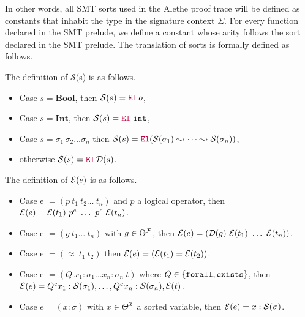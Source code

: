 \smallskip

In other words, all SMT sorts used in the Alethe proof trace will be defined as constants that inhabit the type \set{} in the signature context $\Sigma$.
For every function declared in the SMT prelude, we define a constant whose arity follows the sort declared in the SMT prelude. The translation of sorts is formally defined as follows.

\smallskip

\begin{definition} 
  The definition of $\mathcal{S}$(s) is as follows.
  \begin{itemize}
    \item Case $s = \textbf{Bool}$, then $\Sort{s} = \el\,o$,
    \item Case $s = \textbf{Int}$, then $\Sort{s} = \el~\texttt{int}$,
    \item Case $s = \sigma_1\,\sigma_2 \dots \sigma_n$ then $\Sort{s} = \el{} (\mathcal{S}(\sigma_1) \leadsto \dots \leadsto \mathcal{S}(\sigma_n))$,
    \item otherwise $\Sort{s} = \el\, \mathcal{D}(s)$.
  \end{itemize}
\end{definition}


\begin{definition}
The definition of $\E{e}$ is as follows.
\begin{itemize}
\setlength{\parskip}{0pt}
\item Case e $= (p~t_1~t_2\dots~t_n)$ and $p$ a logical operator, then $\E{e} = \E{t_1}~p^c~\dots~p^c~\E{t_n}$.
\item Case e $= (g~t_1\dots~t_n)$ with $g \in \Theta^\cal{F}$, then $\E{e} = (\mathcal{D}(g)~\E{t_1}~\dots~\E{t_n})$.
\item Case e $= (\approx~t_1~t_2)$ then $\E{e} = (\E{t_1} = \E{t_2})$.
\item Case e $= (Q~x_1 : \sigma_1  \dots x_n : \sigma_n ~t)$ where $Q\in \{\kw{forall}, \kw{exists}\}$, then $\E{e} = Q^c x_1: \cal{S}(\sigma_1), \dots, Q^c x_n: \cal{S}(\sigma_n), \E{t}$. 
\item Case $e = (x: \sigma )$ with $x \in \Theta^\mathcal{X}$ a sorted variable, then $\E{e} = x: \cal{S}(\sigma)$.
\end{itemize}
\end{definition}